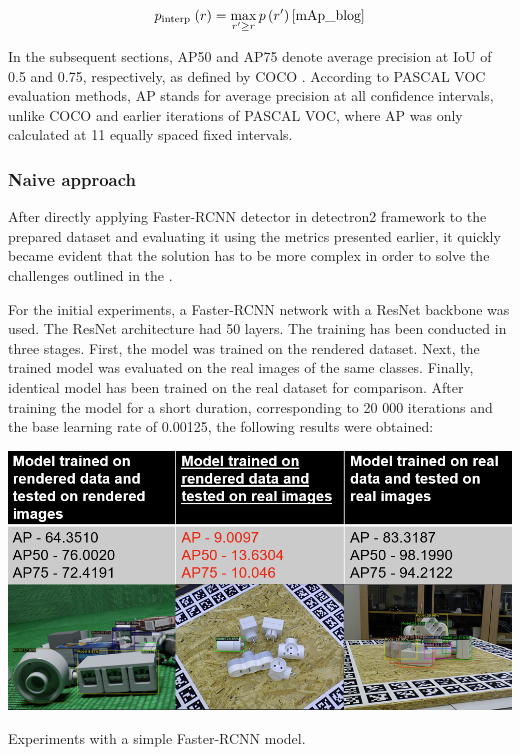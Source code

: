 \documentclass[english, 12pt, a4paper, elec, utf8, a-1b, online]{aaltothesis}
\begin{document}
\begin{equation}
p_{\text {interp }}(r)=\max _{r^{\prime} \geq r} p\left(r^{\prime}\right)
\label{interp}
\cite{mAp_blog}  
\end{equation}

In the subsequent sections, AP50 and AP75 denote average precision at IoU of 0.5 and 0.75, respectively, as defined by COCO \cite{Lin2014}. According to PASCAL VOC \cite{Everingham10} evaluation methods, AP stands for average precision at all confidence intervals, unlike COCO \cite{Lin2014} and earlier iterations of PASCAL VOC, where AP was only calculated at 11 equally spaced fixed intervals.


\subsubsection{Naive approach}
\label{naive} 
After directly applying Faster-RCNN detector\cite{ima} in detectron2 \cite{wu2019detectron2} framework to the prepared dataset and evaluating it using the metrics presented earlier, it quickly became evident that the solution has to be more complex in order to solve the challenges outlined in the . 

For the initial experiments, a Faster-RCNN network with a ResNet backbone was used. The ResNet architecture had 50 layers. The training has been conducted in three stages. First, the model was trained on the rendered dataset. Next, the trained model was evaluated on the real images of the same classes. Finally, identical model has been trained on the real dataset for comparison. After training the model for a short duration, corresponding to 20 000 iterations and the base learning rate of 0.00125, the following results were obtained: 

\begin{table}[htb]
	\begin{center}
		\includegraphics[width=14cm]{./initialExp.png}
	\end{center}
	\caption{Experiments with a simple Faster-RCNN model. }
	\begin{center}
		\label{faster_init}
	\end{center}
\end{table}
\FloatBarrier
\end{document}
